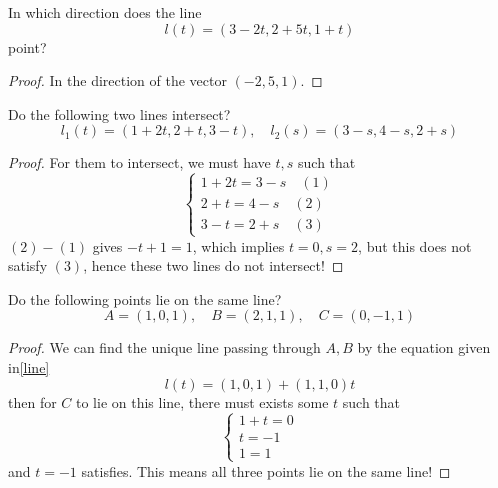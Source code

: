 \documentclass[openany]{book}
\begin{document}
\begin{prob}
    In which direction does the line 
    \begin{equation*}
        l(t)=(3-2t, 2+5t, 1+t)
    \end{equation*}
    point?
\end{prob}
\begin{proof}
    In the direction of the vector $(-2, 5, 1)$.
\end{proof}


\begin{prob}
    Do the following two lines intersect?
    \begin{equation*}
        l_1(t)=(1+2t, 2+t, 3-t), \quad l_2(s)=(3-s, 4-s, 2+s)
    \end{equation*}
\end{prob}
\begin{proof}
    For them to intersect, we must have $t,s$ such that 
    \begin{equation*}
        \begin{cases}
            1+2t=3-s \quad (1)\\
            2+t=4-s \quad (2)\\
            3-t=2+s \quad (3)
        \end{cases}
    \end{equation*}
    $(2)-(1)$ gives $-t+1=1$, which implies $t=0, s=2$, but this does not satisfy $(3)$, hence these two lines do not intersect!
\end{proof}


\begin{prob}
    Do the following points lie on the same line?
    \begin{equation*}
        A=(1,0,1),\quad B=(2,1,1), \quad C=(0,-1,1)
    \end{equation*}
\end{prob}
\begin{proof}
    We can find the unique line passing through $A,B$ by the equation given in\ref{line}
    \begin{equation*}
        l(t)=(1,0,1)+(1,1,0)t
    \end{equation*}
    then for $C$ to lie on this line, there must exists some $t$ such that 
    \begin{equation*}
        \begin{cases}
            1+t=0\\
            t=-1\\
            1=1
        \end{cases}
    \end{equation*}
    and $t=-1$ satisfies. This means all three points lie on the same line!
\end{proof}
\end{document}
